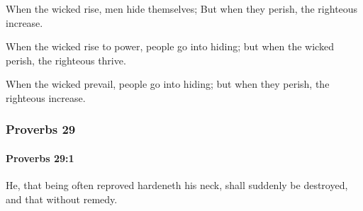 			\begin{versebox}
					\item[BHS] 
					\item[ASV] When the wicked rise, men hide themselves; But when they perish, the righteous increase.
					\item[NIV] When the wicked rise to power, people go into hiding; but when the wicked perish, the righteous thrive.
					\item[NRSV] When the wicked prevail, people go into hiding; but when they perish, the righteous increase.
			\end{versebox}
	\subsubsection{Proverbs 29} %
		\label{PROVERBS-29}

		\paragraph{Proverbs 29:1} %
			\label{PROVERBS-29-1}

			He, that being often reproved hardeneth his neck, shall suddenly be destroyed, and that without remedy.

